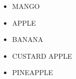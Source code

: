 \documentclass{article}
\begin{document}
\begin{itemize}
\item MANGO
\item APPLE
\item BANANA
\item CUSTARD APPLE
\item PINEAPPLE
\end{itemize}
\end{document}
